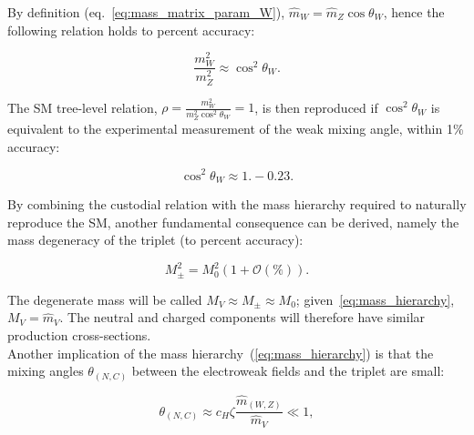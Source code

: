 \noindent By definition (eq.~\ref{eq:mass_matrix_param_W}), $\hat{m}_W = \hat{m}_Z \cos{\theta_W}$, hence the following relation holds to percent accuracy:

\begin{equation}
\frac{m_W^2}{m_Z^2} \approx \cos^2{{\theta}_W}.
\label{eq:mass_ewk_ratio}
\end{equation}
%
%

\noindent The SM tree-level relation, $\rho = \frac{m_W^2}{m_Z^2 \cos^2{{\theta}_W}}  = 1$, is then reproduced if $\cos^2{{\theta}_W}$ is equivalent to the experimental measurement of the weak mixing angle, within 1\% accuracy:

\begin{equation}
{\cos^2{{\theta}_W}} \approx 1. - 0.23.
\end{equation}

%
\noindent By combining the custodial relation with the mass hierarchy required to naturally reproduce the SM, another fundamental consequence can be derived, namely the mass degeneracy of the triplet (to percent accuracy):

\begin{equation}
M_{\pm}^2 = M_0^2 \left(1 + \mathcal{O}(\%) \right).
\label{eq:HVT_degeneracy}
\end{equation}

\noindent The degenerate mass will be called $M_V \approx M_{\pm} \approx M_0$; given~\ref{eq:mass_hierarchy}, $M_V = \hat{m}_V$. The neutral and charged components will therefore have similar production cross-sections.\\ %
Another implication of the mass hierarchy~(\ref{eq:mass_hierarchy}) is that the mixing angles $\theta_{(N,C)}$ between the electroweak fields and the triplet are small:

\begin{equation}
{\theta}_{(N,C)} \approx c_H \zeta \frac{\hat{m}_{(W,Z)}}{ \hat{m}_V } \ll 1,
\label{eq:HVT_small_angles}
\end{equation}

